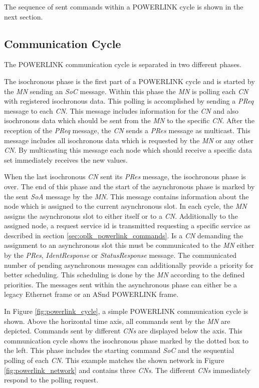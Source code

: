 The sequence of sent commands within a POWERLINK cycle is shown in the next section.

\subsection{Communication Cycle}
\label{sec:oplk_powerlink_commcycle}

The POWERLINK communication cycle is separated in two different phases.

The isochronous phase is the first part of a POWERLINK cycle and is started by the \emph{MN} sending an \emph{SoC} message.
Within this phase the \emph{MN} is polling each \emph{CN} with registered isochronous data.
This polling is accomplished by sending a \emph{PReq} message to each \emph{CN}.
This message includes information for the \emph{CN} and also isochronous data which should be sent from the \emph{MN} to the specific \emph{CN}.
After the reception of the \emph{PReq} message, the \emph{CN} sends a \emph{PRes} message as multicast.
This message includes all isochronous data which is requested by the \emph{MN} or any other \emph{CN}.
By multicasting this message each node which should receive a specific data set immediately receives the new values. \cite[section 4.2.4.1.1]{epsg_epsg_2013}

When the last isochronous \emph{CN} sent its \emph{PRes} message, the isochronous phase is over.
The end of this phase and the start of the asynchronous phase is marked by the sent \emph{SoA} message by the \emph{MN}.
This message contains information about the node which is assigned to the current asynchronous slot.
In each cycle, the \emph{MN} assigns the asynchronous slot to either itself or to a \emph{CN}.
Additionally to the assigned node, a request service id is transmitted requesting a specific service as described in section \ref{sec:oplk_powerlink_commands}.
Is a \emph{CN} demanding the assignment to an asynchronous slot this must be communicated to the \emph{MN} either by the \emph{PRes}, \emph{IdentResponse} or \emph{StatusResponse} message.
The communicated number of pending asynchronous messages can additionally provide a priority for better scheduling.
This scheduling is done by the \emph{MN} according to the defined priorities.
The messages sent within the asynchronous phase can either be a legacy Ethernet frame or an ASnd POWERLINK frame. \cite[section 4.2.4.1.2]{epsg_epsg_2013}

In Figure \ref{fig:powerlink_cycle}, a simple POWERLINK communication cycle is shown.
Above the horizontal time axis, all commands sent by the \emph{MN} are depicted.
Commands sent by different \emph{CNs} are displayed below the axis.
This communication cycle shows the isochronous phase marked by the dotted box to the left.
This phase includes the starting command \emph{SoC} and the sequential polling of each \emph{CN}.
This example matches the shown network in Figure \ref{fig:powerlink_network} and contains three \emph{CNs}.
The different \emph{CNs} immediately respond to the polling request.

